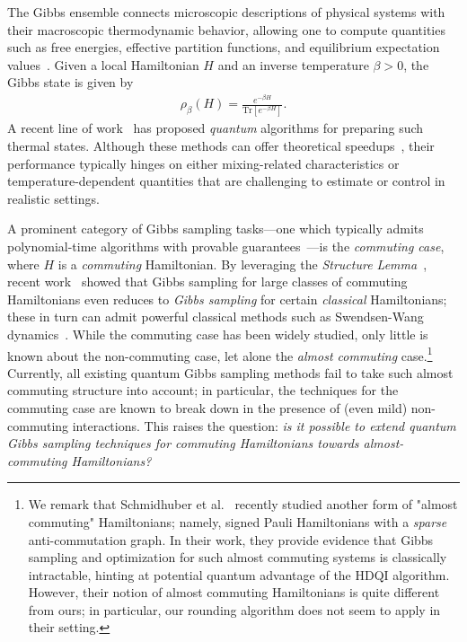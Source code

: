 \documentclass[a4paper,onecolumn,11pt]{quantumarticle}
\theoremstyle{plain}
\begin{document}
The Gibbs ensemble connects microscopic descriptions of physical systems with their macroscopic thermodynamic behavior, allowing one to compute quantities such as free energies, effective partition functions, and equilibrium expectation values~\cite{PathriaBeale2011,Chandler1987,Callen1985,LandauLifshitz1980,Sachdev2011,AltlandSimons2010,Mermin1965,Tuckerman2010,LandauBinder2014}. Given a local Hamiltonian $H$ and an inverse temperature $\beta > 0$, the Gibbs state is given by
\begin{align}\label{eq:gibbs-ex}
\rho_\beta(H) = \frac{e^{-\beta H}}{\mathrm{Tr}\left[e^{-\beta 
H}\right]}.
\end{align}
A recent line of work~\cite{Temme_2011,GilyenThermal23a,chen2023efficient,BCL24,rajakumar2024gibbs} has proposed \textit{quantum} algorithms for preparing such thermal states. Although these methods can offer theoretical speedups~\cite{BCL24,rajakumar2024gibbs}, their performance typically hinges on either mixing-related characteristics or temperature-dependent quantities that are challenging to estimate or control in realistic settings.

A prominent category of Gibbs sampling tasks---one which typically admits polynomial-time algorithms with provable guarantees~\cite{hwang2025gibbsstatepreparationcommuting,schmidhuber2025hamiltoniandecodedquantuminterferometry}---is the \emph{commuting case}, where $H$ is a \emph{commuting} Hamiltonian.
By leveraging the \emph{Structure 
Lemma}~\cite{bravyi2004commutativeversionklocalhamiltonian}, recent 
work~\cite{hwang2025gibbsstatepreparationcommuting} showed that Gibbs 
sampling for large classes of commuting Hamiltonians even reduces to 
\emph{Gibbs sampling} for certain \emph{classical} Hamiltonians; these 
in turn can admit powerful classical methods such as Swendsen-Wang 
dynamics~\cite{PhysRevLett.58.86,feng2022swendsenwangdynamicsferromagneticising}. While the commuting case has been widely studied, only little is known about the non-commuting case, let alone the \emph{almost commuting} case.\footnote{
We remark that Schmidhuber et 
al.~\cite{schmidhuber2025hamiltoniandecodedquantuminterferometry} 
recently studied another form of "almost commuting" Hamiltonians;
namely, signed Pauli Hamiltonians with a \emph{sparse} anti-commutation 
graph. In their work, they provide evidence that Gibbs sampling and 
optimization for such almost commuting 
systems is classically intractable, hinting at potential quantum 
advantage of the HDQI algorithm.
However, their notion of almost commuting Hamiltonians is quite different from 
ours; in particular, our rounding algorithm does not seem to apply in their setting.
}
Currently, all existing quantum Gibbs sampling methods fail to take 
such almost commuting structure into account; in particular, the 
techniques for the commuting case are known to break down in the presence of (even mild) non-commuting interactions. This raises the question: 
\emph{is it possible to extend quantum Gibbs sampling techniques for commuting Hamiltonians towards almost-commuting Hamiltonians?}
\end{document}
